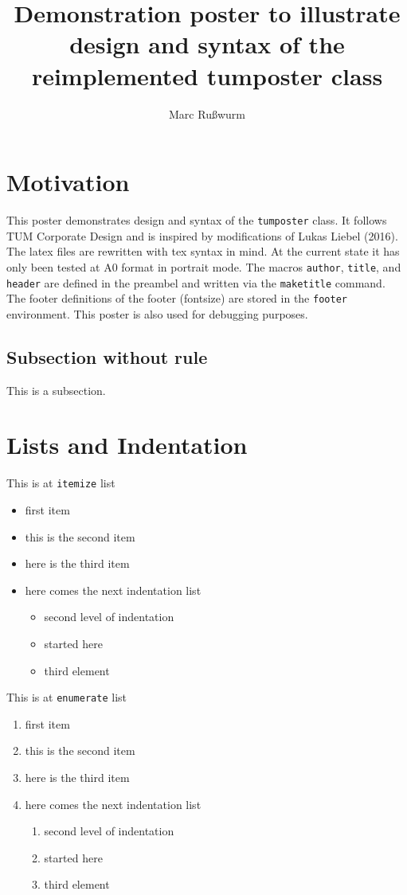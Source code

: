 \documentclass[a0]{tumposter}
\title{
	Demonstration poster to illustrate design and syntax of the reimplemented tumposter class
	}
\author{
	Marc Rußwurm
	}
\begin{document}
\maketitle
\section{Motivation}

This poster demonstrates design and syntax of the \texttt{tumposter} class.
It follows TUM Corporate Design and is inspired by modifications of Lukas Liebel (2016).
The latex files are rewritten with tex syntax in mind.
At the current state it has only been tested at A0 format in portrait mode.
The macros \texttt{author}, \texttt{title}, and \texttt{header} are defined in the preambel and written via the \texttt{maketitle} command.
The footer definitions of the footer (fontsize) are stored in the \texttt{footer} environment.
This poster is also used for debugging purposes.

\subsection{Subsection without rule}	

This is a subsection.
\blindtext

\section{Lists and Indentation}

\begin{multicols}{2}

This is at \texttt{itemize} list
\begin{itemize}
	\item first item
	\item this is the second item
	\item here is the third item
	\item here comes the next indentation list
	\begin{itemize}
		\item second level of indentation
		\item started here
		\item third element
	\end{itemize}
\end{itemize}
\columnbreak

This is at \texttt{enumerate} list
\begin{enumerate}
	\item first item
	\item this is the second item
	\item here is the third item
	\item here comes the next indentation list
	\begin{enumerate}
		\item second level of indentation
		\item started here
		\item third element
	\end{enumerate}
\end{enumerate}
\end{multicols}
\end{document}
